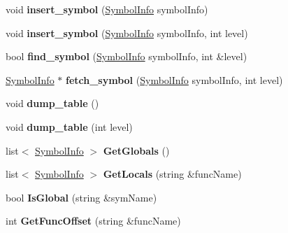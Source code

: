 \begin{DoxyCompactItemize}
\item 
\hypertarget{classSymTab_ad8e59e29c50f039570c5844871bf838c}{void {\bfseries insert\-\_\-symbol} (\hyperlink{structSymbolInfo}{Symbol\-Info} symbol\-Info)}\label{classSymTab_ad8e59e29c50f039570c5844871bf838c}

\item 
\hypertarget{classSymTab_a8372047f573c6d84fa231aa7e9842280}{void {\bfseries insert\-\_\-symbol} (\hyperlink{structSymbolInfo}{Symbol\-Info} symbol\-Info, int level)}\label{classSymTab_a8372047f573c6d84fa231aa7e9842280}

\item 
\hypertarget{classSymTab_a2aedd91e00780c889e60a60fc0795daf}{bool {\bfseries find\-\_\-symbol} (\hyperlink{structSymbolInfo}{Symbol\-Info} symbol\-Info, int \&level)}\label{classSymTab_a2aedd91e00780c889e60a60fc0795daf}

\item 
\hypertarget{classSymTab_ac0bfd9c56cfd8e697046178629adbebc}{\hyperlink{structSymbolInfo}{Symbol\-Info} $\ast$ {\bfseries fetch\-\_\-symbol} (\hyperlink{structSymbolInfo}{Symbol\-Info} symbol\-Info, int level)}\label{classSymTab_ac0bfd9c56cfd8e697046178629adbebc}

\item 
\hypertarget{classSymTab_ab4c005eb114053be22fdbe315542f55b}{void {\bfseries dump\-\_\-table} ()}\label{classSymTab_ab4c005eb114053be22fdbe315542f55b}

\item 
\hypertarget{classSymTab_ad5d45136f341bf024a226fe600fb4dcc}{void {\bfseries dump\-\_\-table} (int level)}\label{classSymTab_ad5d45136f341bf024a226fe600fb4dcc}

\item 
\hypertarget{classSymTab_aced837e720830dd9ccb2d3dde621d489}{list$<$ \hyperlink{structSymbolInfo}{Symbol\-Info} $>$ {\bfseries Get\-Globals} ()}\label{classSymTab_aced837e720830dd9ccb2d3dde621d489}

\item 
\hypertarget{classSymTab_a76b5a70170535019b1fe58fa25a9998c}{list$<$ \hyperlink{structSymbolInfo}{Symbol\-Info} $>$ {\bfseries Get\-Locals} (string \&func\-Name)}\label{classSymTab_a76b5a70170535019b1fe58fa25a9998c}

\item 
\hypertarget{classSymTab_a4c4699d90ffd605b205e9e94be9eacde}{bool {\bfseries Is\-Global} (string \&sym\-Name)}\label{classSymTab_a4c4699d90ffd605b205e9e94be9eacde}

\item 
\hypertarget{classSymTab_a793c31d247f484b04a9283e71f172756}{int {\bfseries Get\-Func\-Offset} (string \&func\-Name)}\label{classSymTab_a793c31d247f484b04a9283e71f172756}


\end{DoxyCompactItemize}
